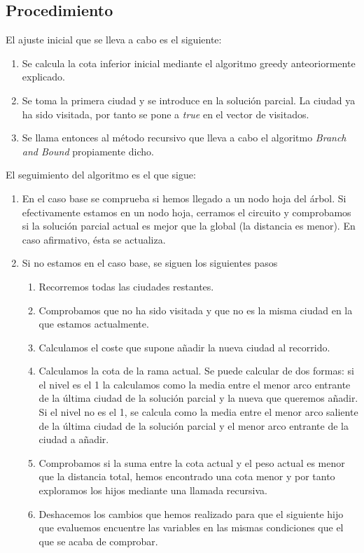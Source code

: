 \documentclass[12pt,spanish]{article}
\begin{document}
\subsection{Procedimiento}

El ajuste inicial que se lleva a cabo es el siguiente:

\begin{enumerate}
	\item Se calcula la cota inferior inicial mediante el algoritmo greedy anteoriormente explicado.
	\item Se toma la primera ciudad y se introduce en la solución parcial. La ciudad ya ha sido visitada, por tanto se pone a \textit{true} en el vector de visitados.
	\item Se llama entonces al método recursivo que lleva a cabo el algoritmo \textit{Branch and Bound} propiamente dicho.

\end{enumerate}

El seguimiento del algoritmo es el que sigue:

\begin{enumerate}
	\item En el caso base se comprueba si hemos llegado a un nodo hoja del árbol. Si efectivamente estamos en un nodo hoja, cerramos el circuito y comprobamos si la solución parcial actual es mejor que la global (la distancia es menor). En caso afirmativo, ésta se actualiza.
	\item Si no estamos en el caso base, se siguen los siguientes pasos
	\begin{enumerate}
		\item Recorremos todas las ciudades restantes.
		\item Comprobamos que no ha sido visitada y que no es la misma ciudad en la que estamos actualmente.
		\item Calculamos el coste que supone añadir la nueva ciudad al recorrido.
		\item Calculamos la cota de la rama actual. Se puede calcular de dos formas: si el nivel es el 1 la calculamos como la media entre el menor arco entrante de la última ciudad de la solución parcial y la nueva que queremos añadir. Si el nivel no es el 1, se calcula como la media entre el menor arco saliente de la última ciudad de la solución parcial y el menor arco entrante de la ciudad a añadir.
		\item Comprobamos si la suma entre la cota actual y el peso actual es menor que la distancia total, hemos encontrado una cota menor y por tanto exploramos los hijos mediante una llamada recursiva.
		\item Deshacemos los cambios que hemos realizado para que el siguiente hijo que evaluemos encuentre las variables en las mismas condiciones que el que se acaba de comprobar.
	\end{enumerate}
\end{enumerate}
\end{document}

